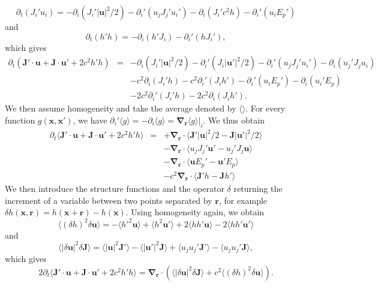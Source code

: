 \documentclass{jfm}
\providecommand\bnabla{\boldsymbol{\nabla}}
\newcommand\p{\ensuremath{\partial}}
\newcommand{\uu}{\textbf{u}}
\newcommand{\xx}{\textbf{x}}
\newcommand{\JJ}{\textbf{J}}
\newcommand{\rr}{\textbf{r}}
\newcommand{\meane}[1]{\langle #1 \rangle}
\begin{document}
\begin{equation}
\p_t ( J_i' u_i ) = - \p_i( J_i'|\uu|^2/2) - \p_i'(u_j J_j' u_i')
-\p_i (J_i' c^2 h)  - \p_i' (u_i E_p')
\end{equation}
and
\begin{equation}
\p_t ( h' h ) = - \p_i( h'J_i ) - \p_i'( hJ_i' ),
\end{equation}
which gives
\begin{eqnarray}
\p_t ( \JJ'\cdot\uu + \JJ\cdot\uu' + 2c^2 h'h )
&=& - \p_i( J_i'|\uu|^2/2) - \p_i'( J_i|\uu'|^2/2) %
- \p_i'(u_j J_j' u_i') - \p_i(u_j' J_j u_i) \nonumber\\
&& -c^2\p_i (J_i'h) - c^2\p_i' (J_ih') %
- \p_i' (u_i E_p') - \p_i (u_i' E_p) \nonumber\\
&& -2c^2\p_i' (J_i'h) - 2c^2\p_i (J_ih').
\end{eqnarray}
We then assume homogeneity and take the average denoted by
$\meane{}$.   For
every function $g(\xx, \xx')$, we have $\p_i' \meane{g} =
-\p_i\meane{g} = \bnabla_{\rr} \meane{g}|_i$. We thus obtain
\begin{eqnarray}
\p_t \meane{ \JJ'\cdot\uu + \JJ\cdot\uu' + 2c^2 h'h }
&=& + \bnabla_{\rr}\cdot\meane{ \JJ'|\uu|^2/2 - \JJ|\uu'|^2/2 } \nonumber\\
&& - \bnabla_{\rr}\cdot\meane{ u_j J_j' \uu' - u_j' J_j \uu } \nonumber\\
&& - \bnabla_{\rr}\cdot\meane{ \uu E_p'- \uu' E_p } \nonumber\\
&& -c^2\bnabla_{\rr}\cdot\meane{ \JJ'h - \JJ h' }
\end{eqnarray}
%
We then introduce the structure functions and the operator $\delta$
returning the increment of a variable between two points separated by $\rr$, 
for example $\delta h (\xx, \rr) = h(\xx+\rr)- h(\xx)$.
%
Using homogeneity again, we obtain
\begin{equation}
\meane{ (\delta h)^2 \delta\uu } = 
-\meane{ h'^2 \uu } + \meane{ h^2 \uu' }
+2\meane{ hh' \uu } - 2\meane{ hh' \uu' }
\end{equation}
and 
\begin{equation}
\meane{ |\delta \uu|^2 \delta\JJ } = 
\meane{  |\uu|^2 \JJ' } - \meane{ |\uu'|^2\JJ }
+\meane{ u_ju_j' \JJ' } - \meane{  u_ju_j' \JJ },
\end{equation}
which gives
\begin{equation} \label{FluxT}
2\p_t \meane{ \JJ'\cdot\uu + \JJ\cdot\uu' + 2c^2 h'h }
= \bnabla_{\rr} \cdot ( \meane{ |\delta \uu|^2 \delta\JJ } 
+ c^2\meane{ (\delta h)^2 \delta\uu } ).
\end{equation}
\end{document}
